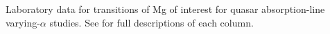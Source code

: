Laboratory data for transitions of Mg of interest for quasar absorption-line varying-$\alpha$ studies. See  for full descriptions of each column.
